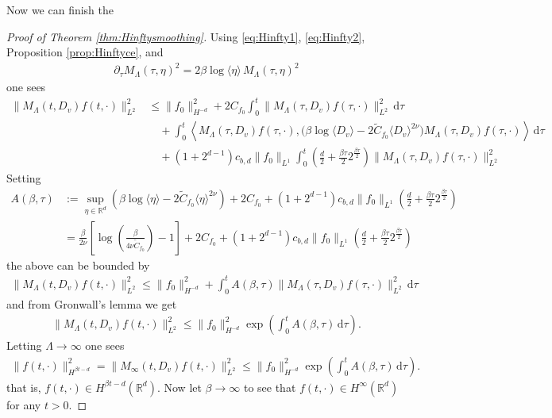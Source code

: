 \documentclass[11pt,a4paper,reqno]{amsart}
\theoremstyle{plain}
\theoremstyle{definition}
\begin{document}
Now we can finish the
\begin{proof}[Proof of Theorem \ref{thm:Hinftysmoothing}]
	Using \eqref{eq:Hinfty1}, \eqref{eq:Hinfty2}, Proposition \ref{prop:Hinftyce}, and
	\begin{align*}
		\partial_\tau M_\Lambda(\tau,\eta)^2
		  = 2\beta \log\langle \eta \rangle \, M_\Lambda(\tau,\eta)^2
	\end{align*}
	 one sees
	\begin{align*}
	 \|M_{\Lambda}(t,D_v)f(t,\cdot)\|_{L^2}^2
	 &\le
	   \|f_0\|_{H^{-d}}^2
	   + 2 C_{f_0} \int_0^t \|M_{\Lambda}(\tau,D_v)f(\tau,\cdot)\|_{L^2}^2 \, \mathrm{d}\tau \\
	 &\quad +
	     \int_0^t \left\langle M_{\Lambda}(\tau,D_v)f(\tau, \cdot), \Big(\beta\log\langle D_v \rangle -2\widetilde{C}_{f_0}\langle D_v\rangle^{2\nu}\Big)M_{\Lambda}(\tau,D_v)f(\tau,\cdot)\right\rangle \,\mathrm{d}\tau \\
	 & \quad+ (1+2^{d-1}) c_{b,d} \|f_0\|_{L^1}
	 	\int_0^t\left(\frac{d}{2} + \frac{\beta \tau}{2}2^{\frac{\beta \tau}{2}} \right) \|M_{\Lambda}(\tau,D_v) f(\tau,\cdot)\|_{L^2}^2
    \end{align*}
	Setting
	\begin{align*}
		A(\beta,\tau) &:=
		 \sup_{\eta\in{\mathbb{R}}^d} \left(\beta\log\langle \eta \rangle - 2\widetilde{C}_{f_0}\langle \eta \rangle^{2\nu}\right)
		 	+ 2 C_{f_0}
		 	+ (1+2^{d-1})c_{b,d} \|f_0\|_{L^1} \left(\frac{d}{2} + \frac{\beta \tau}{2}2^{\frac{\beta \tau}{2}} \right) \\
		 	&= \frac{\beta}{2\nu} \left[ \log\left(\frac{\beta}{4\nu \widetilde{C}_{f_0}}\right) - 1\right] + 2 C_{f_0}
		 	+ (1+2^{d-1})c_{b,d} \|f_0\|_{L^1} \left(\frac{d}{2} + \frac{\beta \tau}{2}2^{\frac{\beta \tau}{2}} \right)
	\end{align*}
	the above can be bounded by
	\begin{align*}
		\|M_{\Lambda}(t,D_v)f(t,\cdot)\|_{L^2}^2
	 	\le
	      \|f_0\|_{H^{-d}}^2 + \int_0^t A(\beta,\tau) \|M_{\Lambda}(\tau,D_v)f(\tau,\cdot)\|_{L^2}^2 \, \mathrm{d}\tau
	\end{align*}
	and from Gronwall's lemma we get
	\begin{align*}
		\|M_{\Lambda}(t,D_v)f(t,\cdot)\|_{L^2}^2
		\le
			\|f_0\|_{H^{-d}}^2 \exp\left( \int_0^t A(\beta,\tau)\, \mathrm{d}\tau \right) .
	\end{align*}
	Letting $\Lambda\to\infty$ one sees
	\begin{align*}
		\|f(t,\cdot)\|_{H^{\beta t-d}}^2 = \|M_\infty(t,D_v)f(t,\cdot)\|_{L^2}^2
		\le
			\|f_0\|_{H^{-d}}^2 \exp\left( \int_0^t A(\beta,\tau)\, \mathrm{d}\tau \right) .
	\end{align*}
	that is, $f(t,\cdot)\in H^{\beta t-d}({\mathbb{R}}^d)$. Now let $\beta\to\infty$ to see that $f(t,\cdot)\in H^{\infty}({\mathbb{R}}^d)$ for any $t>0$.
\end{proof}
\end{document}
